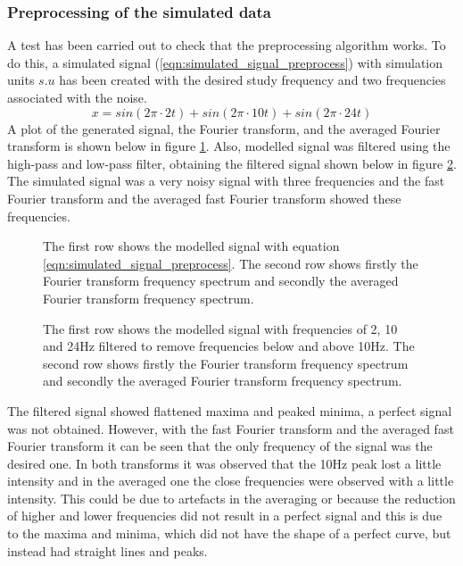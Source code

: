 \documentclass[12pt, a4paper]{article} %
\begin{document}
\subsubsection{Preprocessing of the simulated data}

A test has been carried out to check that the preprocessing algorithm works. To do this, a simulated signal (\ref{eqn:simulated_signal_preprocess}) with simulation units $s.u$ has been created with the desired study frequency and two frequencies associated with the noise. 
\setlength{\parskip}{4mm}
\begin{equation} \label{eqn:simulated_signal_preprocess}
	x = sin(2\pi\cdot 2t) + sin(2\pi\cdot 10t) + sin(2\pi\cdot 24t)
\end{equation}
A plot of the generated signal, the Fourier transform, and the averaged Fourier transform is shown below in figure \ref{fig:noisy_data_simulated}. Also, modelled signal was filtered using the high-pass and low-pass filter, obtaining the filtered signal shown below in figure \ref{fig:noisy_filtered_data_simulated}. The simulated signal was a very noisy signal with three frequencies and the fast Fourier transform and the averaged fast Fourier transform showed these frequencies. 

\begin{figure}[htbp]
	\centering
	
	\caption{The first row shows the modelled signal with equation \ref{eqn:simulated_signal_preprocess}. The second row shows firstly the Fourier transform frequency spectrum and secondly the averaged Fourier transform frequency spectrum.}
	\label{fig:noisy_data_simulated}
\end{figure}


\begin{figure}[htbp]
	\centering
	
	\caption{The first row shows the modelled signal with frequencies of 2, 10 and 24Hz filtered to remove frequencies below and above 10Hz. The second row shows firstly the Fourier transform frequency spectrum and secondly the averaged Fourier transform frequency spectrum.}
	\label{fig:noisy_filtered_data_simulated}
\end{figure}

The filtered signal showed flattened maxima and peaked minima, a perfect signal was not obtained. However, with the fast Fourier transform and the averaged fast Fourier transform it can be seen that the only frequency of the signal was the desired one. In both transforms it was observed that the 10Hz peak lost a little intensity and in the averaged one the close frequencies were observed with a little intensity. This could be due to artefacts in the averaging or because the reduction of higher and lower frequencies did not result in a perfect signal and this is due to the maxima and minima, which did not have the shape of a perfect curve, but instead had straight lines and peaks.
\end{document}
